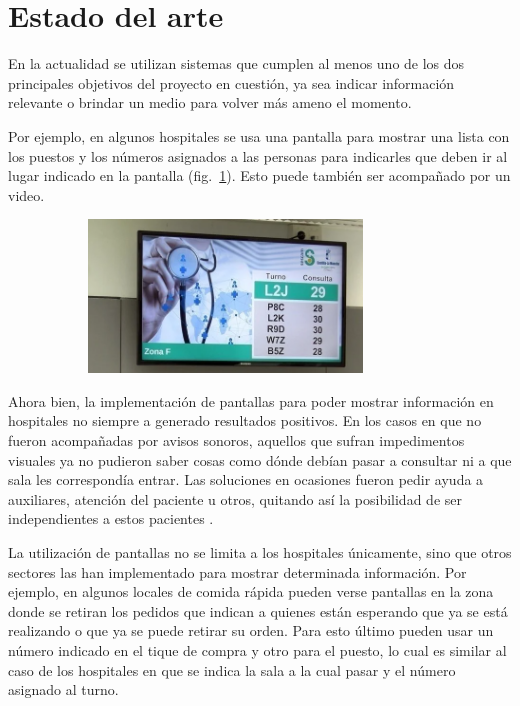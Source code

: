 \documentclass{article}
\begin{document}
\section{Estado del arte}
En la actualidad se utilizan sistemas que cumplen al menos uno de los dos principales objetivos del proyecto en cuestión, ya sea indicar información relevante o brindar un medio para volver más ameno el momento.

Por ejemplo, en algunos hospitales se usa una pantalla para mostrar una lista con los puestos y los números asignados a las personas para indicarles que deben ir al lugar indicado en la pantalla (fig.~\ref{fig:hospital}). Esto puede también ser acompañado por un video. 
\begin{figure}[H]
	\caption{Hospital con pantalla para distribuir pacientes}
    \begin{subfigure}{1.0\textwidth}
	\includegraphics[width=0.8\textwidth]{hospital.png}
    \end{subfigure}
	\label{fig:hospital}
\end{figure}
\vspace{-1.0\baselineskip}
Ahora bien, la implementación de pantallas para poder mostrar información en hospitales no siempre a generado resultados positivos. En los casos en que no fueron acompañadas por avisos sonoros, aquellos que sufran impedimentos visuales ya no pudieron saber cosas como dónde debían pasar a consultar ni a que sala les correspondía entrar. Las soluciones en ocasiones fueron pedir ayuda a auxiliares, atención del paciente u otros, quitando así la posibilidad de ser independientes a estos pacientes \parencite{pantallasChange}.

La utilización de pantallas no se limita a los hospitales únicamente, sino que otros sectores las han implementado para mostrar determinada información. Por ejemplo, en algunos locales de comida rápida pueden verse pantallas en la zona donde se retiran los pedidos que indican a quienes están esperando que ya se está realizando o que ya se puede retirar su orden. Para esto último pueden usar un número indicado en el tique de compra y otro para el puesto, lo cual es similar al caso de los hospitales en que se indica la sala a la cual pasar y el número asignado al turno.
\end{document}
